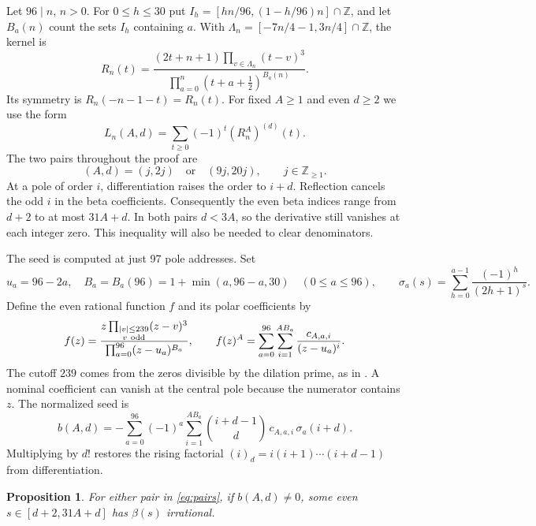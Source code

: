 \documentclass[11pt]{article}
\newtheorem{proposition}[theorem]{Proposition}
\numberwithin{equation}{section}
\newcommand{\Z}{\mathbb Z}
\begin{document}
Let \(96\mid n\), \(n>0\). For \(0\le h\le30\) put
\(I_h=[hn/96,(1-h/96)n]\cap\Z\), and let \(B_a(n)\) count the
sets \(I_h\) containing \(a\). With
\(\Lambda_n=[-7n/4-1,3n/4]\cap\Z\), the kernel is
\[
 R_n(t)=\frac{(2t+n+1)\prod_{v\in\Lambda_n}(t-v)^3}
                {\prod_{a=0}^{n}(t+a+\tfrac12)^{B_a(n)}} .
\]
Its symmetry is \(R_n(-n-1-t)=R_n(t)\). For fixed \(A\ge1\) and even
\(d\ge2\) we use the form
\[
       L_n(A,d)=\sum_{t\ge0}(-1)^t (R_n^A)^{(d)}(t).
\]
The two pairs throughout the proof are
\begin{equation}\label{eq:pairs}
                  (A,d)=(j,2j)\quad\text{or}\quad(9j,20j),
                  \qquad j\in\Z_{\ge1}.
\end{equation}
At a pole of order \(i\), differentiation raises the order to \(i+d\).
Reflection cancels the odd \(i\) in the beta coefficients.
Consequently the even beta indices range from \(d+2\) to at most
\(31A+d\). In both pairs \(d<3A\), so the derivative still vanishes
at each integer zero. This inequality will also be needed to clear
denominators.

The seed is computed at just 97 pole addresses. Set
\[
 u_a=96-2a,\quad B_a=B_a(96)=1+\min(a,96-a,30)\quad(0\le a\le96),
 \qquad \sigma_a(s)=\sum_{h=0}^{a-1}\frac{(-1)^h}{(2h+1)^s}.
\]
Define the even rational function \(f\) and its polar coefficients by
\begin{equation}\label{eq:f}
 f(z)=\frac{z\prod_{\substack{|v|\le239\\v\ {\rm odd}}}(z-v)^3}
                     {\prod_{a=0}^{96}(z-u_a)^{B_a}},
 \qquad f(z)^A=\sum_{a=0}^{96}\sum_{i=1}^{A B_a}\frac{c_{A,a,i}}{(z-u_a)^i}.
\end{equation}
The cutoff \(239\) comes from the zeros divisible by the dilation prime,
as in \cite[Section 5]{fifteen}. A nominal coefficient can vanish at the
central pole because the numerator contains \(z\). The normalized seed is
\begin{equation}\label{eq:seed}
 b(A,d)=-\sum_{a=0}^{96}(-1)^a\sum_{i=1}^{A B_a}
       \binom{i+d-1}{d}\,c_{A,a,i}\,\sigma_a(i+d).
\end{equation}
Multiplying by \(d!\) restores the rising factorial
\((i)_d=i(i+1)\cdots(i+d-1)\) from differentiation.

\begin{proposition}\label{prop:fixed}
For either pair in \eqref{eq:pairs}, if \(b(A,d)\ne0\), some even
\(s\in[d+2,31A+d]\) has \(\beta(s)\) irrational.
\end{proposition}
\end{document}
